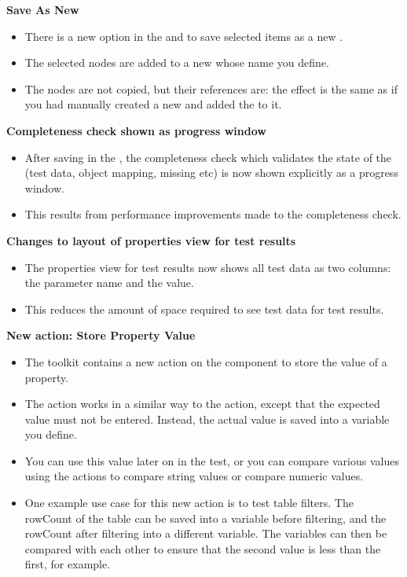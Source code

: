 \textbf{Save As New \gdcase{}}
\begin{itemize}
\item There is a new option in the \gdtestcaseeditor{} and \gdtestsuiteeditor{} to save selected items as a new \gdcase{}.
\item The selected nodes are added to a new \gdcase{} whose name you define.
\item The nodes are not copied, but their references are: the effect is the same as if you had manually created a new \gdcase{} and added the \gdcases{} to it. 
\end{itemize}

\textbf{Completeness check shown as progress window}\\
\begin{itemize}
\item After saving in the \ite{}, the completeness check which validates the state of the \gdproject{} (test data, object mapping, missing \gdcases{} etc) is now shown explicitly as a progress window.
\item This results from performance improvements made to the completeness check.
\end{itemize} 

\textbf{Changes to layout of properties view for test results}\\
\begin{itemize}
\item The properties view for test results now shows all test data as two columns: the parameter name and the value.
\item This reduces the amount of space required to see test data for test results. 
\end{itemize} 

\textbf{New action: Store Property Value}\\
\begin{itemize}
\item The  toolkit contains a new action on the  component to store the value of a property.
\item The action works in a similar way to the  action, except that the expected value must not be entered. Instead, the actual value is saved into a variable you define.
\item You can use this value later on in the test, or you can compare various values using the actions to compare string values or compare numeric values. 
\item One example use case for this new action is to test table filters. The rowCount of the table can be saved into a variable before filtering, and the rowCount after filtering into a different variable. The variables can then be compared with each other to ensure that the second value is less than the first, for example.
\end{itemize} 

